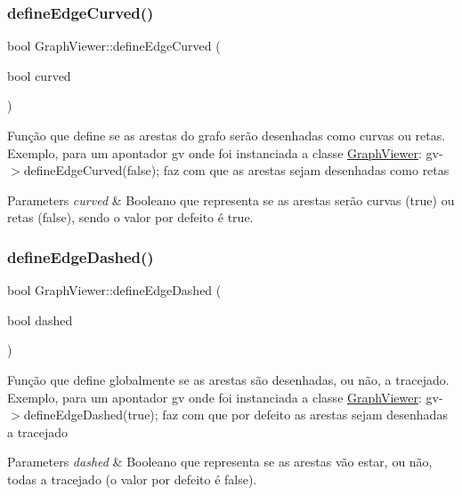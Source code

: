 \subsubsection{\texorpdfstring{defineEdgeCurved()}{defineEdgeCurved()}}
{\footnotesize\ttfamily bool Graph\+Viewer\+::define\+Edge\+Curved (\begin{DoxyParamCaption}\item[{bool}]{curved }\end{DoxyParamCaption})}

Função que define se as arestas do grafo serão desenhadas como curvas ou retas. Exemplo, para um apontador gv onde foi instanciada a classe \mbox{\hyperlink{class_graph_viewer}{Graph\+Viewer}}\+: gv-\/$>$define\+Edge\+Curved(false); faz com que as arestas sejam desenhadas como retas


\begin{DoxyParams}{Parameters}
{\em curved} & Booleano que representa se as arestas serão curvas (true) ou retas (false), sendo o valor por defeito é true. \\
\hline
\end{DoxyParams}
\mbox{\label{class_graph_viewer_af785279b5c204df0e274b20c36276fc3}} 
\subsubsection{\texorpdfstring{defineEdgeDashed()}{defineEdgeDashed()}}
{\footnotesize\ttfamily bool Graph\+Viewer\+::define\+Edge\+Dashed (\begin{DoxyParamCaption}\item[{bool}]{dashed }\end{DoxyParamCaption})}

Função que define globalmente se as arestas são desenhadas, ou não, a tracejado. Exemplo, para um apontador gv onde foi instanciada a classe \mbox{\hyperlink{class_graph_viewer}{Graph\+Viewer}}\+: gv-\/$>$define\+Edge\+Dashed(true); faz com que por defeito as arestas sejam desenhadas a tracejado


\begin{DoxyParams}{Parameters}
{\em dashed} & Booleano que representa se as arestas vão estar, ou não, todas a tracejado (o valor por defeito é false). \\
\hline
\end{DoxyParams}
\mbox{\label{class_graph_viewer_a76de8676b7a93d72af514b84cdaa4d21}} 
